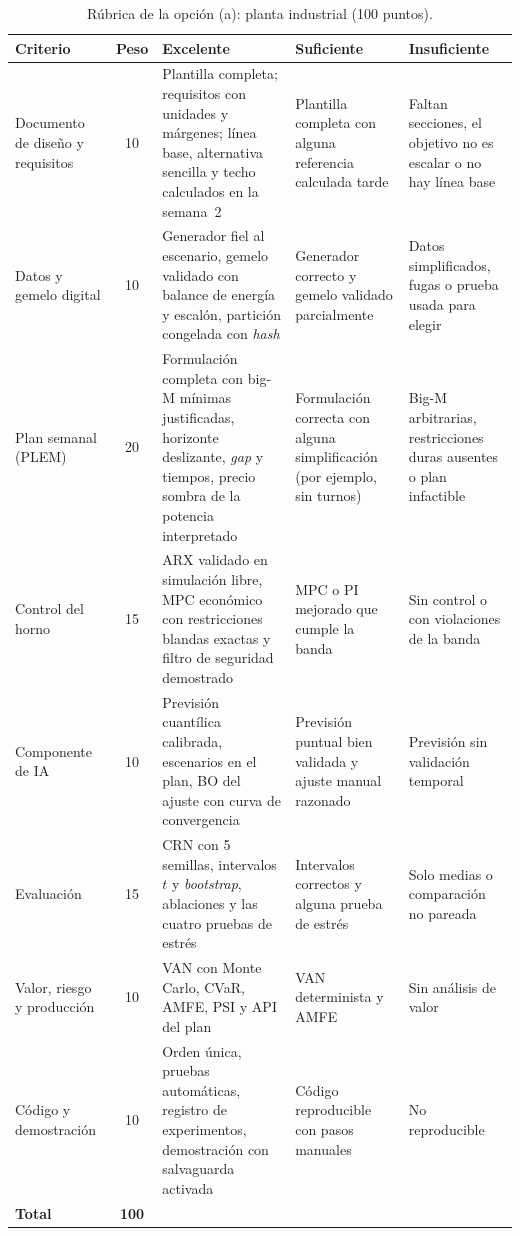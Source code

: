 \begin{table}[p]
\centering\footnotesize
\caption{Rúbrica de la opción (a): planta industrial (100 puntos).}\label{tab:rubrica-a}
\begin{tabularx}{\textwidth}{@{}>{\raggedright\arraybackslash}p{2.5cm}c>{\raggedright\arraybackslash}X>{\raggedright\arraybackslash}X>{\raggedright\arraybackslash}X@{}}
\toprule
Criterio & Peso & Excelente & Suficiente & Insuficiente \\
\midrule
Documento de diseño y requisitos & 10 & Plantilla completa; requisitos con unidades y márgenes; línea base, alternativa sencilla y techo calculados en la semana~2 & Plantilla completa con alguna referencia calculada tarde & Faltan secciones, el objetivo no es escalar o no hay línea base \\
\addlinespace
Datos y gemelo digital & 10 & Generador fiel al escenario, gemelo validado con balance de energía y escalón, partición congelada con \emph{hash} & Generador correcto y gemelo validado parcialmente & Datos simplificados, fugas o prueba usada para elegir \\
\addlinespace
Plan semanal (PLEM) & 20 & Formulación completa con big-M mínimas justificadas, horizonte deslizante, \emph{gap} y tiempos, precio sombra de la potencia interpretado & Formulación correcta con alguna simplificación (por ejemplo, sin turnos) & Big-M arbitrarias, restricciones duras ausentes o plan infactible \\
\addlinespace
Control del horno & 15 & ARX validado en simulación libre, MPC económico con restricciones blandas exactas y filtro de seguridad demostrado & MPC o PI mejorado que cumple la banda & Sin control o con violaciones de la banda \\
\addlinespace
Componente de IA & 10 & Previsión cuantílica calibrada, escenarios en el plan, BO del ajuste con curva de convergencia & Previsión puntual bien validada y ajuste manual razonado & Previsión sin validación temporal \\
\addlinespace
Evaluación & 15 & CRN con 5 semillas, intervalos $t$ y \emph{bootstrap}, ablaciones y las cuatro pruebas de estrés & Intervalos correctos y alguna prueba de estrés & Solo medias o comparación no pareada \\
\addlinespace
Valor, riesgo y producción & 10 & VAN con Monte Carlo, CVaR, AMFE, PSI y API del plan & VAN determinista y AMFE & Sin análisis de valor \\
\addlinespace
Código y demostración & 10 & Orden única, pruebas automáticas, registro de experimentos, demostración con salvaguarda activada & Código reproducible con pasos manuales & No reproducible \\
\midrule
\textbf{Total} & \textbf{100} & & & \\
\bottomrule
\end{tabularx}
\end{table}

